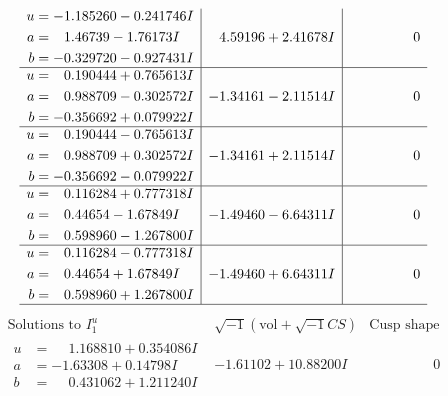 \documentclass[1p]{elsarticle_modified}
\theoremstyle{definition}
\newcommand{\I}{\sqrt{-1}}
\begin{document}
$$\begin{array}{c|c|c}
\begin{aligned}
u &= -1.185260 - 0.241746 I \\
a &= \phantom{-}1.46739 - 1.76173 I \\
b &= -0.329720 - 0.927431 I\end{aligned}
 & \phantom{-}4.59196 + 2.41678 I & \phantom{-0.000000 } 0 \\ \hline\begin{aligned}
u &= \phantom{-}0.190444 + 0.765613 I \\
a &= \phantom{-}0.988709 - 0.302572 I \\
b &= -0.356692 + 0.079922 I\end{aligned}
 & -1.34161 - 2.11514 I & \phantom{-0.000000 } 0 \\ \hline\begin{aligned}
u &= \phantom{-}0.190444 - 0.765613 I \\
a &= \phantom{-}0.988709 + 0.302572 I \\
b &= -0.356692 - 0.079922 I\end{aligned}
 & -1.34161 + 2.11514 I & \phantom{-0.000000 } 0 \\ \hline\begin{aligned}
u &= \phantom{-}0.116284 + 0.777318 I \\
a &= \phantom{-}0.44654 - 1.67849 I \\
b &= \phantom{-}0.598960 - 1.267800 I\end{aligned}
 & -1.49460 - 6.64311 I & \phantom{-0.000000 } 0 \\ \hline\begin{aligned}
u &= \phantom{-}0.116284 - 0.777318 I \\
a &= \phantom{-}0.44654 + 1.67849 I \\
b &= \phantom{-}0.598960 + 1.267800 I\end{aligned}
 & -1.49460 + 6.64311 I & \phantom{-0.000000 } 0\\
 \hline 
 \end{array}$$\newpage$$\begin{array}{c|c|c}  
\text{Solutions to }I^u_{1}& \I (\text{vol} + \sqrt{-1}CS) & \text{Cusp shape}\\
 \hline 
\begin{aligned}
u &= \phantom{-}1.168810 + 0.354086 I \\
a &= -1.63308 + 0.14798 I \\
b &= \phantom{-}0.431062 + 1.211240 I\end{aligned}
 & -1.61102 + 10.88200 I & \phantom{-0.000000 } 0 \\ \hline\begin{aligned}

\end{aligned}
\end{array}$$
\end{document}

